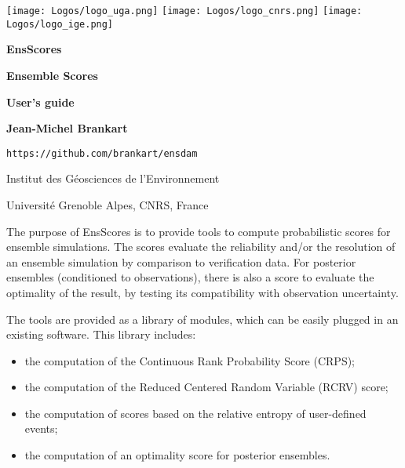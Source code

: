 \documentclass[11pt]{article}
\begin{document}
\pagestyle{empty}

\centerline{
\texttt{[image: Logos/logo\_uga.png]}
\hspace{5mm}
\texttt{[image: Logos/logo\_cnrs.png]}
\hfill
\texttt{[image: Logos/logo\_ige.png]}
}

\vspace{20mm}

\begin{center}

{\Huge\bf EnsScores}

\vspace{10mm}

{\Large\bf Ensemble Scores}

\vspace{10mm}

{\Large\bf User's guide}

\vspace{10mm}

{\large\bf Jean-Michel Brankart}

\vspace{5mm}
{\tt https://github.com/brankart/ensdam}

\vspace{5mm}
{\large Institut des G\'eosciences de l'Environnement}

\vspace{1mm}
{\large Universit\'e Grenoble Alpes, CNRS, France}

\end{center}

\vspace{20mm}
The purpose of EnsScores is to provide tools
to compute probabilistic scores for ensemble simulations.
The scores evaluate the reliability and/or the resolution of an ensemble simulation
by comparison to verification data.
For posterior ensembles (conditioned to observations),
there is also a score to evaluate the optimality of the result,
by testing its compatibility with observation uncertainty.

The tools are provided as a library of modules,
which can be easily plugged in an existing software.
This library includes:

\begin{itemize}
\item the computation of the Continuous Rank Probability Score (CRPS);
\item the computation of the Reduced Centered Random Variable (RCRV) score;
\item the computation of scores based on the relative entropy of user-defined events;
\item the computation of an optimality score for posterior ensembles.
\end{itemize}
\end{document}
